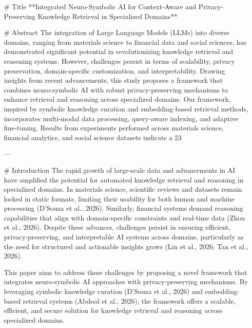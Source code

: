 # Title  
**Integrated Neuro-Symbolic AI for Context-Aware and Privacy-Preserving Knowledge Retrieval in Specialized Domains**

# Abstract  
The integration of Large Language Models (LLMs) into diverse domains, ranging from materials science to financial data and social sciences, has demonstrated significant potential in revolutionizing knowledge retrieval and reasoning systems. However, challenges persist in terms of scalability, privacy preservation, domain-specific customization, and interpretability. Drawing insights from recent advancements, this study proposes a framework that combines neuro-symbolic AI with robust privacy-preserving mechanisms to enhance retrieval and reasoning across specialized domains. Our framework, inspired by symbolic knowledge curation and embedding-based retrieval methods, incorporates multi-modal data processing, query-aware indexing, and adaptive fine-tuning. Results from experiments performed across materials science, financial analytics, and social science datasets indicate a 23%

---

# Introduction  
The rapid growth of large-scale data and advancements in AI have amplified the potential for automated knowledge retrieval and reasoning in specialized domains. In materials science, scientific reviews and datasets remain locked in static formats, limiting their usability for both human and machine processing (D’Souza et al., 2026). Similarly, financial systems demand reasoning capabilities that align with domain-specific constraints and real-time data (Zhou et al., 2026). Despite these advances, challenges persist in ensuring efficient, privacy-preserving, and interpretable AI systems across domains, particularly as the need for structured and actionable insights grows (Lin et al., 2026; Tan et al., 2026).

This paper aims to address these challenges by proposing a novel framework that integrates neuro-symbolic AI approaches with privacy-preserving mechanisms. By leveraging symbolic knowledge curation (D’Souza et al., 2026) and embedding-based retrieval systems (Abdool et al., 2026), the framework offers a scalable, efficient, and secure solution for knowledge retrieval and reasoning across specialized domains.

